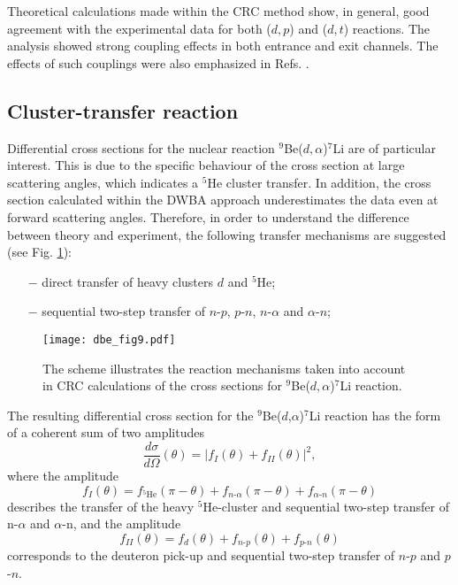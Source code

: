 \documentclass[
12pt, %
oneside, %
english, %
onehalfspacing, %
onehalfspacing, %
headsepline, %
]{MastersDoctoralThesis} %
\begin{document}
Theoretical calculations made within the CRC method show, in general, good agreement with the experimental data for both ($d,p$)  and ($d,t$) reactions.
The analysis showed strong coupling effects in both entrance and exit channels. The effects of such couplings were also emphasized in Refs. \cite{harakeh1980strong, rudchik2016}.

\subsection{Cluster-transfer reaction}
Differential cross sections for the nuclear reaction ${^9}$Be($d,\alpha$)${}^7$Li are of particular interest. This is due to the specific behaviour of the cross section at large scattering angles, which indicates a ${}^5$He cluster transfer. In addition, the cross section calculated within the DWBA approach underestimates the data even at forward scattering angles. Therefore, in order to understand the difference between theory and experiment, the following transfer mechanisms are suggested (see Fig. \ref{dbe_fig9}):
\begin{itemize}
\item[$-$] direct transfer of heavy clusters $d$ and ${}^5$He;
\item[$-$] sequential two-step transfer of $n$-$p$, $p$-$n$, $n$-$\alpha$ and $\alpha$-$n$;
\end{itemize}


\begin{figure}[tp]
\centering
\texttt{[image: dbe\_fig9.pdf]}
\decoRule
\caption{\label{dbe_fig9} \footnotesize The scheme illustrates the reaction mechanisms taken into account in CRC calculations of the cross sections for ${}^9$Be($d,\alpha$)${}^7$Li reaction.}
\end{figure}


The resulting differential cross section for the ${^9}$Be($d$,$\alpha$)${}^7$Li reaction has the form of a coherent sum of two amplitudes
\begin{equation}
\frac{d\sigma}{d\Omega}(\theta) =\vert f_{I}(\theta) + f_{II}(\theta) \vert ^2,
\end{equation}
where the amplitude
\begin{equation} \label{eq:ampl1}
f_{I}(\theta)=f_{{}^5\textrm{He}}(\pi - \theta) + f_{n\textrm{-}\alpha}(\pi - \theta) + f_{\alpha\textrm{-}n}(\pi - \theta)
\end{equation}
describes the transfer of the heavy ${}^5$He-cluster and sequential two-step transfer of n-$\alpha$ and $\alpha$-n, and the amplitude
\begin{equation} \label{eq:ampl2}
f_{II}(\theta)=f_{d}(\theta) + f_{n\textrm{-}p}( \theta) + f_{p\textrm{-}n}(\theta)
\end{equation}
corresponds to the deuteron pick-up and sequential two-step transfer of $n$-$p$ and $p$-$n$.
\end{document}
